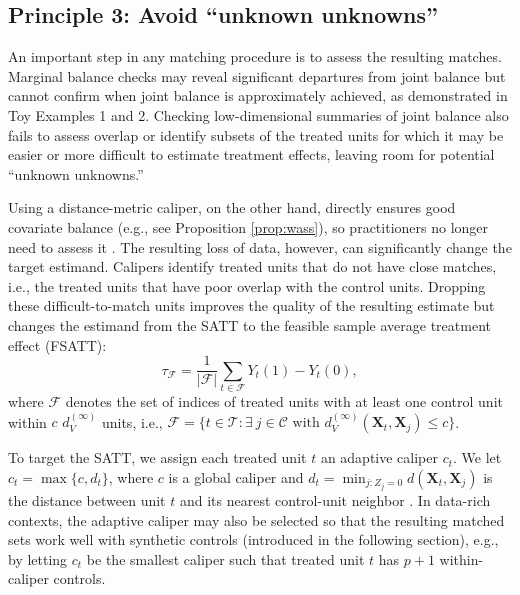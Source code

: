\documentclass{article}
\newcommand{\bX}{\mathbf{X}}
\newcommand{\Xt}{\mathbf{X}_t}
\newcommand{\Xj}{\mathbf{X}_j}
\begin{document}
\subsection{Principle 3: Avoid ``unknown unknowns''}
\label{sec:avoid}

An important step in any matching procedure is to assess the resulting matches.
Marginal balance checks may reveal significant departures from joint balance but cannot confirm when joint balance is approximately achieved, as demonstrated in Toy Examples 1 and 2.
Checking low-dimensional summaries of joint balance also fails to assess overlap or identify subsets of the treated units for which it may be easier or more difficult to estimate treatment effects, leaving room for potential ``unknown unknowns.''


Using a distance-metric caliper, on the other hand, directly ensures good covariate balance (e.g., see Proposition \ref{prop:wass}), so practitioners no longer need to assess it \citep{iacus2012causal}.
The resulting loss of data, however, can significantly change the target estimand.
Calipers identify treated units that do not have close matches, i.e., the treated units that have poor overlap with the control units.
Dropping these difficult-to-match units improves the quality of the resulting estimate but changes the estimand from the SATT to the feasible sample average treatment effect (FSATT):
$$\tau_\mathcal{F} = \frac{1}{|\mathcal{F}|} \sum_{t \in \mathcal{F}} Y_t(1) - Y_t(0),$$
where $\mathcal{F}$ denotes the set of indices of treated units with at least one control unit within $c$ $d_V^{(\infty)}$ units, i.e., $\mathcal{F} = \{t \in \mathcal{T}: \exists \ j \in \mathcal{C} \text{ with } d_V^{(\infty)}(\Xt, \Xj) \leq c\}$.

To target the SATT, we assign each treated unit $t$ an adaptive caliper $c_t$.
We let $c_t = \max \{c, d_t\}$, where $c$ is a global caliper and $d_t = \min_{j:Z_j=0} d(\bX_t, \bX_j)$ is the distance between unit $t$ and its nearest control-unit neighbor \citep{dehejia2002propensity}.
In data-rich contexts, the adaptive caliper may also be selected so that the resulting matched sets work well with synthetic controls (introduced in the following section), e.g., by letting $c_t$ be the smallest caliper such that treated unit $t$ has $p+1$ within-caliper controls.
\end{document}
